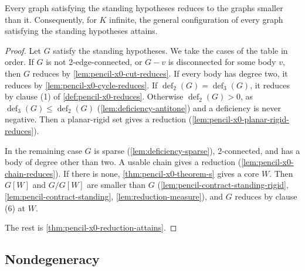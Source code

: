 \begin{theorem}
  \label{thm:pencil-x0-coverage}
  \leanok
  Every graph satisfying the standing hypotheses reduces to the graphs
  smaller than it. Consequently, for $K$ infinite, the general
  configuration of every graph satisfying the standing hypotheses
  attains.
\end{theorem}
\begin{proof}
  \leanok
  Let $G$ satisfy the standing hypotheses. We take the cases of the
  table in order. If $G$ is not 2-edge-connected, or $G - v$ is
  disconnected for some body $v$, then $G$ reduces by
  \cref{lem:pencil-x0-cut-reduces}. If every body has degree two, it
  reduces by \cref{lem:pencil-x0-cycle-reduces}. If
  $\operatorname{def}_2(G) = \operatorname{def}_3(G)$, it reduces by
  clause (1) of \cref{def:pencil-x0-reduces}. Otherwise
  $\operatorname{def}_2(G) > 0$, as $\operatorname{def}_3(G) \le
  \operatorname{def}_2(G)$ (\cref{lem:deficiency-antitone}) and a
  deficiency is never negative. Then a planar-rigid set gives a
  reduction (\cref{lem:pencil-x0-planar-rigid-reduces}).

  In the remaining case $G$ is sparse (\cref{lem:deficiency-sparse}),
  2-connected, and has a body of degree other than two. A usable chain
  gives a reduction (\cref{lem:pencil-x0-chain-reduces}). If there is
  none, \cref{thm:pencil-x0-theorem-s} gives a core $W$. Then $G[W]$ and
  $G/G[W]$ are smaller than $G$
  (\cref{lem:pencil-contract-standing-rigid},
  \cref{lem:pencil-contract-standing}, \cref{lem:reduction-measure}), and
  $G$ reduces by clause (6) at $W$.

  The rest is \cref{thm:pencil-x0-reduction-attains}.
\end{proof}

\subsection{Nondegeneracy}
\label{sec:main-component-statements}

